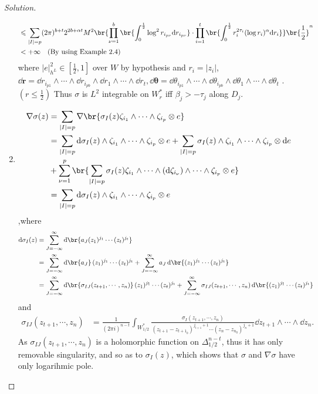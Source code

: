 \documentclass[twoside,openany,12pt]{beautynote}
\begin{document}
\begin{proof}[Solution]
\begin{enumerate}
\begin{align*}
            &\leqslant \sum_{|I|=p}(2\pi)^{b+t} 2^{2b+\alpha t} M^2  \br{\prod_{\nu=1}^b\br{ \int_{0}^{\frac 12} \log^2 r_{i_{p\nu}} \dd r_{i_{p\nu}} }\cdot \prod_{i=1}^t\br{ \int_{0}^{\frac 12} r_i^{2\tau_i}(\log r_i)^{\alpha} \dd r_i } } \br{\frac 12}^n\\ 
            &<+\infty \text{\quad (By using Example 2.4)}
        \end{align*}
            where $|e|^2_{h^L}\in [\frac 12,1]$ over $W$ by hypothesis and $r_i=|z_i|$, $\dd\bm{r}=\dd r_{i_{p1}}\wedge \cdots \wedge\dd r_{i_{pb}}\wedge \dd r_{1}\wedge \cdots \wedge \dd r_{t}, \dd\bm{\theta}=\dd \theta_{i_{p1}}\wedge \cdots \wedge\dd \theta_{i_{pb}}\wedge \dd \theta_{1}\wedge \cdots \wedge \dd \theta_{t}$ . $(r\leq \frac 12)$ Thus $\sigma$ is $L^2$ integrable on $W_r^*$ iff $\beta_j>-\tau_j$ along $D_j$.
            \clearpage
        \item \begin{align*}
            \nabla \sigma(z) &=\sum_{\abs{I}=p} \nabla \br{\sigma_I(z) \zeta_{i_1}\wedge\cdots\wedge\zeta_{i_p}\otimes e}\\ 
            &=\sum_{\abs{I}=p} \dd\sigma_I(z) \wedge\zeta_{i_1}\wedge\cdots\wedge\zeta_{i_p}\otimes e+\sum_{\abs{I}=p} \sigma_I(z) \wedge\zeta_{i_1}\wedge\cdots\wedge\zeta_{i_p}\otimes \dd e\\
            &+ \sum_{\nu=1}^p \br{\sum_{\abs{I}=p} \sigma_I(z) \zeta_{i_1}\wedge\cdots\wedge(\dd\zeta_{i_\nu})\wedge\cdots\wedge\zeta_{i_p}\otimes e}\\ 
            &=\sum_{\abs{I}=p} \dd\sigma_I(z) \wedge\zeta_{i_1}\wedge\cdots\wedge\zeta_{i_p}\otimes e
        \end{align*}
            ,where \begin{align*}
                \dd\sigma_I(z) &=\sum_{J=-\infty}^{\infty} \dd \br{ a_J (z_1)^{j_1} \cdots (z_t)^{j_t}}\\ 
                &=\sum_{J=-\infty}^{\infty} \dd \br{a_J } (z_1)^{j_1} \cdots (z_t)^{j_t}+\sum_{J=-\infty}^{\infty} a_J \dd \br{(z_1)^{j_1} \cdots (z_t)^{j_t}}\\ 
                &=\sum_{J=-\infty}^{\infty} \dd \br{\sigma_{IJ}(z_{t+1},\cdots,z_n)} (z_1)^{j_1} \cdots (z_t)^{j_t}+\sum_{J=-\infty}^{\infty} \sigma_{IJ}(z_{t+1},\cdots,z_n) \dd \br{(z_1)^{j_1} \cdots (z_t)^{j_t}}
            \end{align*}
            and 
            \begin{align*}
                \sigma_{IJ}(z_{t+1},\cdots,z_n) &=\frac{1}{(2\pi i)^{n-t}} \int_{W_{1/2}^*}\frac{\sigma_I(z_{t+1},\cdots,z_n)}{(z_{t+1}-z_{{t+1}_0})^{j_{t+1}+1} \cdots (z_n-z_{n_0})^{j_n+1}}\dd z_{t+1}\wedge\cdots\wedge\dd z_n.
            \end{align*}
                As $\sigma_{IJ}(z_{t+1},\cdots,z_n)$ is a holomorphic function on $\Delta_{1/2}^{n-t}$, thus it has only removable singularity, and so as to $\sigma_I(z)$, which shows that $\sigma$ and $\nabla\sigma$ have only logarihmic pole.
                

    \end{enumerate}
\end{proof}
\end{document}
